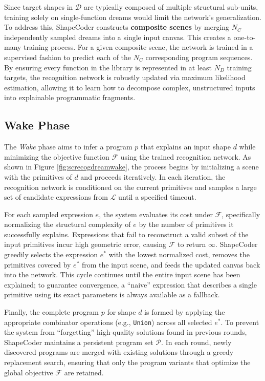 \documentclass{thesis}
\begin{document}
Since target shapes in $\mathcal{D}$ are typically composed of multiple structural sub-units, training solely on single-function dreams would limit the network's generalization. To address this, ShapeCoder constructs \textbf{composite scenes} by merging $N_C$ independently sampled dreams into a single input canvas. This creates a one-to-many training process. For a given composite scene, the network is trained in a supervised fashion to predict each of the $N_C$ corresponding program sequences. By ensuring every function in the library is represented in at least $N_D$ training targets, the recognition network is robustly updated via maximum likelihood estimation, allowing it to learn how to decompose complex, unstructured inputs into explainable programmatic fragments.

\subsection{Wake Phase}

The \textit{Wake} phase aims to infer a program $p$ that explains an input shape $d$ while minimizing the objective function $\mathcal{F}$ using the trained recognition network. As shown in Figure \ref{fig:screcogdreamwake}, the process begins by initializing a scene with the primitives of $d$ and proceeds iteratively. In each iteration, the recognition network is conditioned on the current primitives and samples a large set of candidate expressions from $\mathcal{L}$ until a specified timeout.

For each sampled expression $e$, the system evaluates its cost under $\mathcal{F}$, specifically normalizing the structural complexity of $e$ by the number of primitives it successfully explains. Expressions that fail to reconstruct a valid subset of the input primitives incur high geometric error, causing $\mathcal{F}$ to return $\infty$. ShapeCoder greedily selects the expression $e^*$ with the lowest normalized cost, removes the primitives covered by $e^*$ from the input scene, and feeds the updated canvas back into the network. This cycle continues until the entire input scene has been explained; to guarantee convergence, a ``naive'' expression that describes a single primitive using its exact parameters is always available as a fallback.

Finally, the complete program $p$ for shape $d$ is formed by applying the appropriate combinator operations (e.g., \texttt{Union}) across all selected $e^*$. To prevent the system from ``forgetting'' high-quality solutions found in previous rounds, ShapeCoder maintains a persistent program set $\mathcal{P}$. In each round, newly discovered programs are merged with existing solutions through a greedy replacement search, ensuring that only the program variants that optimize the global objective $\mathcal{F}$ are retained.
\end{document}
